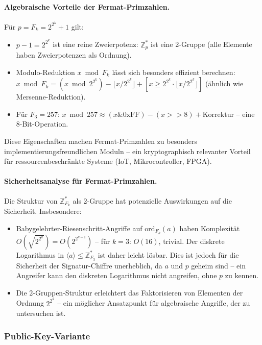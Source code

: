 ﻿\documentclass[a4paper,12pt]{scrreprt}
\theoremstyle{definition}
\begin{document}
\paragraph{Algebraische Vorteile der Fermat-Primzahlen.}
Für $p = F_k = 2^{2^k}+1$ gilt:
\begin{itemize}
  \item $p - 1 = 2^{2^k}$ ist eine reine Zweierpotenz: $\mathbb{Z}_p^*$ ist eine 2-Gruppe (alle Elemente haben Zweierpotenzen als Ordnung).
  \item Modulo-Reduktion $x \bmod F_k$ lässt sich besonders effizient berechnen: $x \bmod F_k = (x \bmod 2^{2^k}) - \lfloor x / 2^{2^k} \rfloor + [x \geq 2^{2^k} \cdot \lfloor x / 2^{2^k}\rfloor]$ (ähnlich wie Mersenne-Reduktion).
  \item Für $F_3 = 257$: $x \bmod 257 \approx (x \& 0\mathrm{xFF}) - (x >> 8) + \mathrm{Korrektur}$ -- eine 8-Bit-Operation.
\end{itemize}

Diese Eigenschaften machen Fermat-Primzahlen zu besonders implementierungsfreundlichen Moduln -- ein kryptographisch relevanter Vorteil für ressourcenbeschränkte Systeme (IoT, Mikrocontroller, FPGA).

\paragraph{Sicherheitsanalyse für Fermat-Primzahlen.}
Die Struktur von $\mathbb{Z}_{F_k}^*$ als 2-Gruppe hat potenzielle Auswirkungen auf die Sicherheit. Insbesondere:
\begin{itemize}
  \item Babygelehrter-Riesenschritt-Angriffe auf $\mathrm{ord}_{F_k}(a)$ haben Komplexität $O(\sqrt{2^{2^k}}) = O(2^{2^{k-1}})$ -- für $k=3$: $O(16)$, trivial. Der diskrete Logarithmus in $\langle a \rangle \leq \mathbb{Z}_{F_3}^*$ ist daher leicht lösbar. Dies ist jedoch für die Sicherheit der Signatur-Chiffre unerheblich, da $a$ und $p$ geheim sind -- ein Angreifer kann den diskreten Logarithmus nicht angreifen, ohne $p$ zu kennen.
  \item Die 2-Gruppen-Struktur erleichtert das Faktorisieren von Elementen der Ordnung $2^{2^k}$ -- ein möglicher Ansatzpunkt für algebraische Angriffe, der zu untersuchen ist.
\end{itemize}

\subsubsection{Public-Key-Variante}
\end{document}

